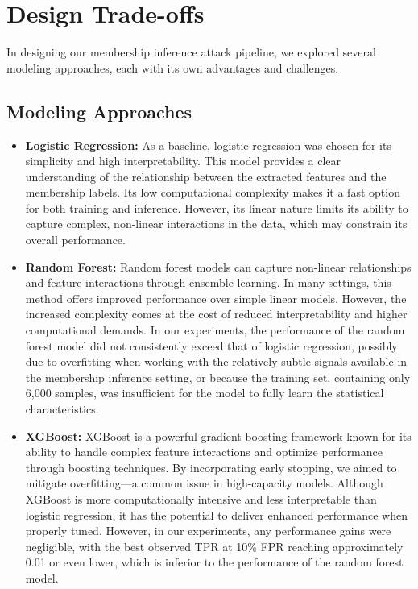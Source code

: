 \documentclass[12pt]{article}
\begin{document}
\section{Design Trade-offs}
\label{sec:design-tradeoffs}
In designing our membership inference attack pipeline, we explored several modeling approaches, each with its own advantages and challenges.

\subsection{Modeling Approaches}
\begin{itemize}
    \item \textbf{Logistic Regression:}  
    As a baseline, logistic regression was chosen for its simplicity and high interpretability. This model provides a clear understanding of the relationship between the extracted features and the membership labels. Its low computational complexity makes it a fast option for both training and inference. However, its linear nature limits its ability to capture complex, non-linear interactions in the data, which may constrain its overall performance.

    \item \textbf{Random Forest:}  
    Random forest models can capture non-linear relationships and feature interactions through ensemble learning. In many settings, this method offers improved performance over simple linear models. However, the increased complexity comes at the cost of reduced interpretability and higher computational demands. In our experiments, the performance of the random forest model did not consistently exceed that of logistic regression, possibly due to overfitting when working with the relatively subtle signals available in the membership inference setting, or because the training set, containing only 6,000 samples, was insufficient for the model to fully learn the statistical characteristics.

    \item \textbf{XGBoost:}  
    XGBoost is a powerful gradient boosting framework known for its ability to handle complex feature interactions and optimize performance through boosting techniques. By incorporating early stopping, we aimed to mitigate overfitting—a common issue in high-capacity models. Although XGBoost is more computationally intensive and less interpretable than logistic regression, it has the potential to deliver enhanced performance when properly tuned. However, in our experiments, any performance gains were negligible, with the best observed TPR at 10\% FPR reaching approximately 0.01 or even lower, which is inferior to the performance of the random forest model.
\end{itemize}
\end{document}
